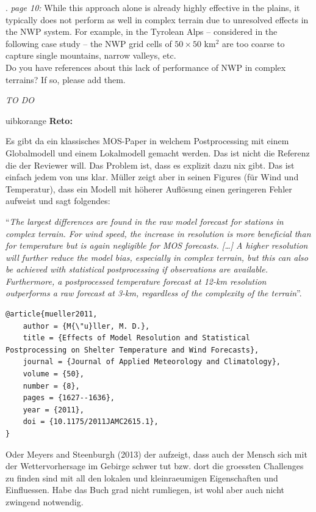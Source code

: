 \documentclass[american,foldmarks=false,noconfig]{uibklttr}
\newenvironment{review}{\fontshape{\itdefault}\fontseries{\bfdefault} \selectfont \smallskip}{\par}
\newenvironment{reto}{
    \begin{color}{uibkorange}
    \textbf{Reto:~}
        \itshape
}{
    \end{color}
}
\begin{document}
\begin{review}
11. {\color{quotecolor}\textit{page 10:} While this approach 
alone is already highly effective in the plains, it typically 
does not perform as well in complex terrain due to unresolved 
effects in the NWP system. For example, in the Tyrolean 
Alps -- considered in the following case study -- the NWP grid 
cells of $50 \times 50$ km$^2$ are too coarse to capture single 
mountains, narrow valleys, etc.}\\
Do you have references about this lack of performance of NWP 
in complex terrains? If so, please add them.
\end{review}

\textit{TO DO}

\begin{reto}
Es gibt da ein klassisches MOS-Paper in welchem Postprocessing
mit einem Globalmodell und einem Lokalmodell gemacht werden.
Das ist nicht die Referenz die der Reviewer will.
Das Problem ist, dass es explizit dazu nix gibt. Das ist einfach
jedem von uns klar. M\"uller zeigt aber in seinen Figures (f\"ur
Wind und Temperatur), dass ein Modell mit h\"oherer Aufl\"osung
einen geringeren Fehler aufweist und sagt folgendes:

``\textit{The largest differences are found in the raw
model forecast for stations in complex terrain. For wind
speed, the increase in resolution is more beneficial than
for temperature but is again negligible for MOS forecasts.
[\dots]
A higher resolution will
further reduce the model bias, especially in complex
terrain, but this can also be achieved with statistical
postprocessing if observations are available. Furthermore,
a postprocessed temperature forecast at 12-km
resolution outperforms a raw forecast at 3-km, regardless
of the complexity of the terrain}''.

\begin{verbatim}
@article{mueller2011,
    author = {M{\"u}ller, M. D.},
    title = {Effects of Model Resolution and Statistical Postprocessing on Shelter Temperature and Wind Forecasts},
    journal = {Journal of Applied Meteorology and Climatology},
    volume = {50},
    number = {8},
    pages = {1627--1636},
    year = {2011},
    doi = {10.1175/2011JAMC2615.1},
}
\end{verbatim}

Oder Meyers and Steenburgh (2013) der aufzeigt, dass auch der Mensch sich mit
der Wettervorhersage im Gebirge schwer tut bzw. dort die groessten Challenges
zu finden sind mit all den lokalen und kleinraeumigen Eigenschaften und Einfluessen.
Habe das Buch grad nicht rumliegen, ist wohl aber auch nicht zwingend notwendig.


\end{reto}
\end{document}
